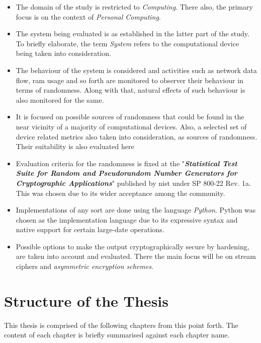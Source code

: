 \begin{itemize}
    \item The domain of the study is restricted to \textit{Computing}. There also, the primary focus is on the context of \textit{Personal Computing}.
    
    \item The system being evaluated is as established in the latter part of the study. To briefly elaborate, the term \textit{System} refers to the computational device being taken into consideration.
    
    \item The behaviour of the system is considered and activities such as network data flow, \acrfull{ram} usage and so forth are monitored to observer their behaviour in terms of randomness. Along with that, natural effects of such behaviour is also monitored for the same.
    
    \item It is focused on possible sources of randomness that could be found in the near vicinity of a majority of computational devices. Also, a selected set of device related metrics also taken into consideration, as sources of randomness. Their suitability is also evaluated here
    
    \item Evaluation criteria for the randomness is fixed at the "\textit{\textbf{Statistical Test Suite for Random and Pseudorandom Number Generators for Cryptographic Applications}}" published by \acrfull{nist} under SP 800-22 Rev. 1a. This was chosen due to its wider acceptance among the community.
    
    \item Implementations of any sort are done using the language \textit{Python}. Python was chosen as the implementation language due to its expressive syntax and native support for certain large-date operations.
    
    \item Possible options to make the output cryptographically secure by hardening, are taken into account and evaluated. There the main focus will be on stream ciphers and \textit{asymmetric encryption schemes}.
\end{itemize}

\section{Structure of the Thesis}

This thesis is comprised of the following chapters from this point forth. The content of each chapter is briefly summarised against each chapter name.

